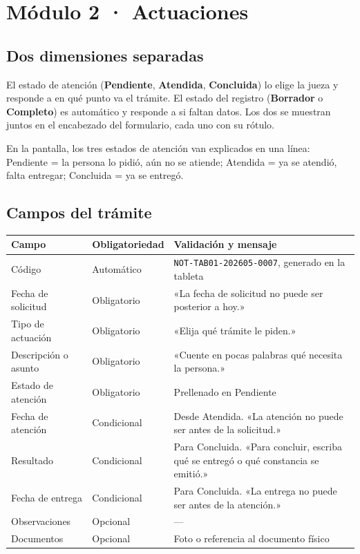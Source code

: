 \documentclass[11pt,a4paper]{article}
\begin{document}


\section{Módulo 2 · Actuaciones}

\subsection{Dos dimensiones separadas}

El estado de atención (\textbf{Pendiente}, \textbf{Atendida}, \textbf{Concluida}) lo elige la jueza y responde a en qué punto va el trámite. El estado del registro (\textbf{Borrador} o \textbf{Completo}) es automático y responde a si faltan datos. Los dos se muestran juntos en el encabezado del formulario, cada uno con su rótulo.

En la pantalla, los tres estados de atención van explicados en una línea: Pendiente = la persona lo pidió, aún no se atiende; Atendida = ya se atendió, falta entregar; Concluida = ya se entregó.

\subsection{Campos del trámite}

\begin{center}
\small
\begin{tabular}{@{}p{3.0cm}p{2.4cm}p{8.8cm}@{}}
\toprule
\textbf{Campo} & \textbf{Obligatoriedad} & \textbf{Validación y mensaje} \\
\midrule
Código & Automático & \texttt{NOT-TAB01-202605-0007}, generado en la tableta \\
Fecha de solicitud & Obligatorio & «La fecha de solicitud no puede ser posterior a hoy.» \\
Tipo de actuación & Obligatorio & «Elija qué trámite le piden.» \\
Descripción o asunto & Obligatorio & «Cuente en pocas palabras qué necesita la persona.» \\
Estado de atención & Obligatorio & Prellenado en Pendiente \\
Fecha de atención & Condicional & Desde Atendida. «La atención no puede ser antes de la solicitud.» \\
Resultado & Condicional & Para Concluida. «Para concluir, escriba qué se entregó o qué constancia se emitió.» \\
Fecha de entrega & Condicional & Para Concluida. «La entrega no puede ser antes de la atención.» \\
Observaciones & Opcional & --- \\
Documentos & Opcional & Foto o referencia al documento físico \\
\bottomrule
\end{tabular}
\end{center}
\end{document}
